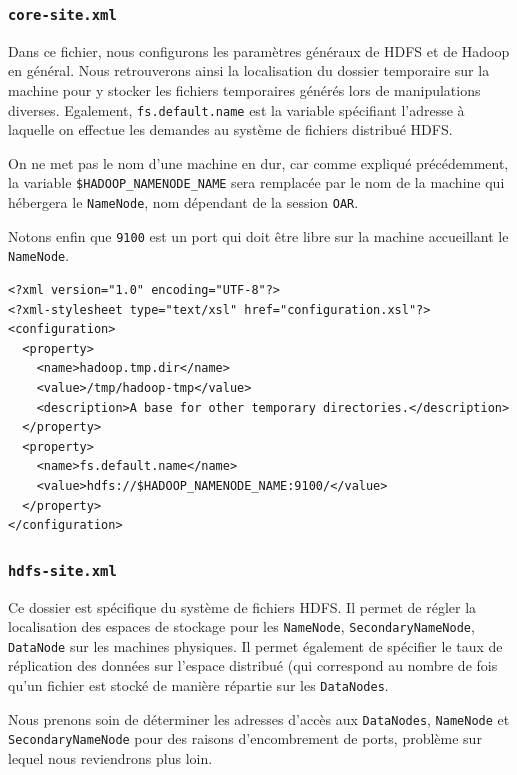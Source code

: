 \subsubsection{\texttt{core-site.xml}}
\label{sec:core-site.xml}

\par Dans ce fichier, nous configurons les paramètres généraux de HDFS et de Hadoop en général. Nous retrouverons ainsi la localisation du dossier temporaire sur la machine pour y stocker les fichiers temporaires générés lors de manipulations diverses. Egalement, \texttt{fs.default.name} est la variable spécifiant l'adresse à laquelle on effectue les demandes au système de fichiers distribué HDFS.
\par On ne met pas le nom d'une machine en dur, car comme expliqué précédemment, la variable \texttt{\$HADOOP\_NAMENODE\_NAME} sera remplacée par le nom de la machine qui hébergera le \texttt{NameNode}, nom dépendant de la session \texttt{OAR}.

\par Notons enfin que \texttt{9100} est un port qui doit être libre sur la machine accueillant le \texttt{NameNode}.

\begin{verbatim}
<?xml version="1.0" encoding="UTF-8"?>
<?xml-stylesheet type="text/xsl" href="configuration.xsl"?>
<configuration>
  <property>
    <name>hadoop.tmp.dir</name>
    <value>/tmp/hadoop-tmp</value>
    <description>A base for other temporary directories.</description>
  </property>
  <property>
    <name>fs.default.name</name>
    <value>hdfs://$HADOOP_NAMENODE_NAME:9100/</value>
  </property>
</configuration>
\end{verbatim}

\subsubsection{\texttt{hdfs-site.xml}}
\label{sec:hdfs-site.xml-1}

\par Ce dossier est spécifique du système de fichiers HDFS. Il permet de régler la localisation des espaces de stockage pour les \texttt{NameNode}, \texttt{SecondaryNameNode}, \texttt{DataNode} sur les machines physiques. Il permet également de spécifier le taux de réplication des données sur l'espace distribué (qui correspond au nombre de fois qu'un fichier est stocké de manière répartie sur les \texttt{DataNodes}.

\par Nous prenons soin de déterminer les adresses d'accès aux \texttt{DataNodes}, \texttt{NameNode} et \texttt{SecondaryNameNode} pour des raisons d'encombrement de ports, problème sur lequel nous reviendrons plus loin.

